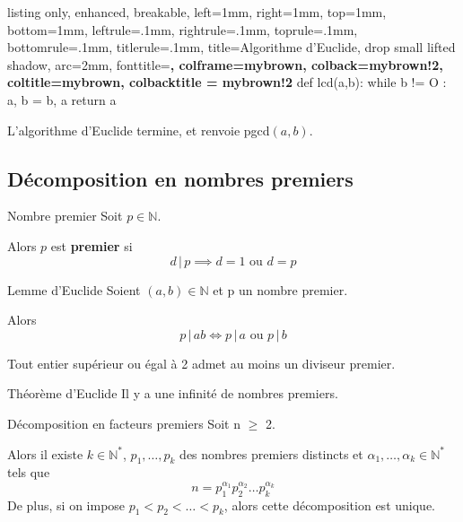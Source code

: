     \begin{tcblisting}{listing only, enhanced, breakable,
        left=1mm, right=1mm, top=1mm, bottom=1mm,
        leftrule=.1mm, rightrule=.1mm, toprule=.1mm, bottomrule=.1mm, titlerule=.1mm, title=Algorithme d’Euclide,
        drop small lifted shadow,
        arc=2mm,
        fonttitle=\normalfont\bfseries,
        colframe=mybrown, colback=mybrown!2, coltitle=mybrown, colbacktitle = mybrown!2
        }
    def lcd(a,b):
        while b != O :
            a, b = b, a%
        return a
    \end{tcblisting}
    
    \begin{prop}{}{}
        L’algorithme d’Euclide termine, et renvoie pgcd$(a,b)$.
    \end{prop}

\subsection{Décomposition en nombres premiers}

    \begin{defi}{Nombre premier}{}
	    Soit $p \in \mathbb{N}$.

	    Alors $p$ est \textbf{premier} si \[ d\,| \,p \implies d= 1 \text{ ou } d =p \]
    \end{defi}

    \begin{prop}{Lemme d’Euclide}{}
        Soient $(a,b) \in \mathbb{N}$ et p un nombre premier.
        
        Alors \[ p \, | \, ab \iff p \, | \, a \text{ ou } p \, | \, b \]
        \end{prop}
        
        \begin{prop}{}{}
        Tout entier supérieur ou égal à 2 admet au moins un diviseur premier.
        \end{prop}
        
        \begin{theo}{Théorème d’Euclide}{}
        Il y a une infinité de nombres premiers.
        \end{theo}
        
        \begin{theo}{Décomposition en facteurs premiers}{}
        Soit n $\geq$ 2.
        
        Alors il existe $k \in \mathbb{N}^{*}$, $p_1,\ldots,p_k$ des nombres premiers distincts et $\alpha_1,\ldots,\alpha_k \in \mathbb{N}^{*}$ tels que \[ n = p_{1}^{\alpha_1}p_{2}^{\alpha_2}\ldots p_{k}^{\alpha_k} \]
        De plus, si on impose $p_1 < p_2 < \ldots < p_k$, alors cette décomposition est unique.
        \end{theo}
        
